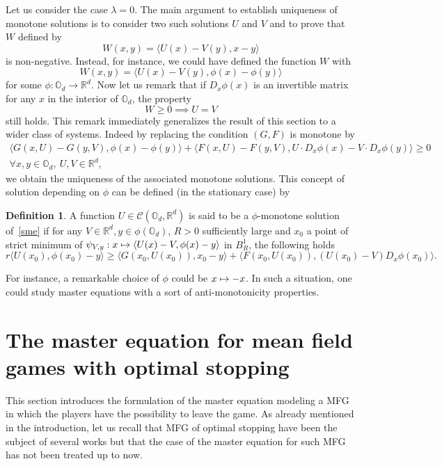 \documentclass[10pt]{amsart}
\let\mathcal\mathscr
\newcommand\mto{\mathchoice{\longmapsto}{\mapsto}{\mapsto}{\mapsto}}
\theoremstyle{definition}
\newtheorem{Def}{Definition}[section]
\begin{document}
Let us consider the case $\lambda = 0$. The main argument to establish uniqueness of monotone solutions is to consider two such solutions $U$ and $V$ and to prove that $W$ defined by
\begin{equation*}
W(x,y) = \langle U(x)-V(y), x-y\rangle
\end{equation*}
is non-negative. Instead, for instance, we could have defined the function $W$ with
\begin{equation*}
W(x,y) = \langle U(x)-V(y), \phi(x)-\phi(y)\rangle
\end{equation*}
for some $\phi: \mathbb{O}_d \to \mathbb{R}^d$. Now let us remark that if $D_x\phi(x)$ is an invertible matrix for any $x$ in the interior of $\mathbb{O}_d$, the property
\begin{equation*}
W \geq 0 \implies U = V
\end{equation*}
still holds. This remark immediately generalizes the result of this section to a wider class of systems. Indeed by replacing the condition $(G,F)$ is monotone by
\begin{multline*}
\langle G(x,U)-G(y,V), \phi(x)-\phi(y) \rangle+\langle F(x,U)-F(y,V), U\cdot D_x \phi(x)-V\cdot D_x \phi(y) \rangle \geq 0\\  \forall x,y \in \mathbb{O}_d,\ U,V \in \mathbb{R}^d,
\end{multline*}
we obtain the uniqueness of the associated monotone solutions. This concept of solution depending on $\phi$ can be defined (in the stationary case) by
\begin{Def}\label{defmongen}
A function $U \in \mathcal{C}(\mathbb{O}_d, \mathbb{R}^d)$ is said to be a $\phi$-monotone solution of~\eqref{sme} if for any $V \in \mathbb{R}^d, y \in \phi(\mathbb{O}_d)$, $R>0$ sufficiently large and $x_0$ a point of strict minimum of $\psi_{V,y}: x \mto \langle U(x)-V, \phi(x)-y\rangle$ in $B^1_R$, the following holds
\[
r\langle U(x_0), \phi(x_0)-y\rangle \geq \langle G(x_0, U(x_0)), x_0-y\rangle+\langle F(x_0,U(x_0)), (U(x_0)- V)D_x\phi(x_0) \rangle.
\]
\end{Def}
For instance, a remarkable choice of $\phi$ could be $x \mto-x$. In such a situation, one could study master equations with a sort of anti-monotonicity properties.

\section{The master equation for mean field games with optimal stopping}\label{sectstop}
This section introduces the formulation of the master equation modeling a MFG in which the players have the possibility to leave the game. As already mentioned in the introduction, let us recall that MFG of optimal stopping have been the subject of several works but that the case of the master equation for such MFG has not been treated up to now.
\end{document}
